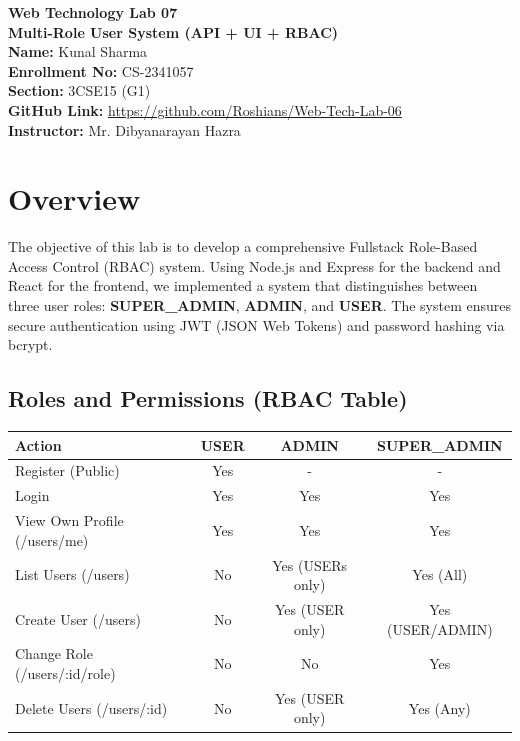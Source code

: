 \documentclass[12pt]{article}
\begin{document}
\begin{titlepage}
    \centering
    \vspace*{2cm}
    \Huge\textbf{Web Technology Lab 07}\\[0.5cm]
    \Large\textbf{Multi-Role User System (API + UI + RBAC)}\\[2cm]
    
    \textbf{Name:} Kunal Sharma\\
    \textbf{Enrollment No:} CS-2341057\\
    \textbf{Section:} 3CSE15 (G1)\\
    \textbf{GitHub Link:} \href{https://github.com/Roshians/Web-Tech-Lab-06}{https://github.com/Roshians/Web-Tech-Lab-06}\\[2cm]
    
    \vfill
    \textbf{Instructor:} Mr. Dibyanarayan Hazra
    \vfill
\end{titlepage}

\section{Overview}
The objective of this lab is to develop a comprehensive Fullstack Role-Based Access Control (RBAC) system. Using Node.js and Express for the backend and React for the frontend, we implemented a system that distinguishes between three user roles: \textbf{SUPER\_ADMIN}, \textbf{ADMIN}, and \textbf{USER}. The system ensures secure authentication using JWT (JSON Web Tokens) and password hashing via bcrypt.

\subsection{Roles and Permissions (RBAC Table)}
\begin{table}[ht!]
\centering
\small
\begin{tabular}{|l|c|c|c|}
\hline
\textbf{Action} & \textbf{USER} & \textbf{ADMIN} & \textbf{SUPER\_ADMIN} \\ \hline
Register (Public) & Yes & - & - \\ \hline
Login & Yes & Yes & Yes \\ \hline
View Own Profile (/users/me) & Yes & Yes & Yes \\ \hline
List Users (/users) & No & Yes (USERs only) & Yes (All) \\ \hline
Create User (/users) & No & Yes (USER only) & Yes (USER/ADMIN) \\ \hline
Change Role (/users/:id/role) & No & No & Yes \\ \hline
Delete Users (/users/:id) & No & Yes (USER only) & Yes (Any) \\ \hline
\end{tabular}
\end{table}
\end{document}
